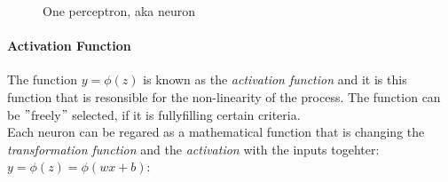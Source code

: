 \begin{figure}[h]
\centering
{}
\caption{One perceptron, aka neuron}
\end{figure}

\paragraph{Activation Function}
The function $y=\phi(z)$ is known as the \textit{activation function} and it is this function that is resonsible for the non-linearity of the process. The function can be $"$freely$"$ selected, if it is fullyfilling certain criteria. \\

Each neuron can be regared as a mathematical function that is changing the \textit{transformation function} and the \textit{activation} with the inputs togehter: $y=\phi(z)= \phi\left(wx+b\right)$:


